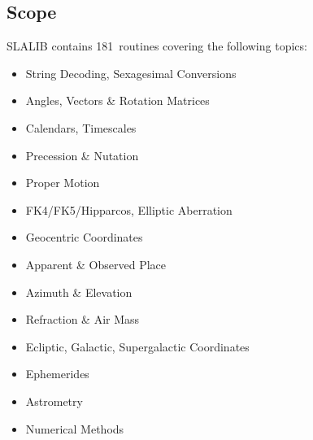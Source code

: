 \documentclass[11pt,twoside]{article}
\newcommand{\nroutines} {181}
\begin{document}
\subsection{Scope}
SLALIB contains \nroutines\ routines covering the following topics:
\begin{itemize}
\item String Decoding,
      Sexagesimal Conversions
\item Angles, Vectors \& Rotation Matrices
\item Calendars,
      Timescales
\item Precession \& Nutation
\item Proper Motion
\item FK4/FK5/Hipparcos,
      Elliptic Aberration
\item Geocentric Coordinates
\item Apparent \& Observed Place
\item Azimuth \& Elevation
\item Refraction \& Air Mass
\item Ecliptic,
      Galactic,
      Supergalactic Coordinates
\item Ephemerides
\item Astrometry
\item Numerical Methods
\end{itemize}
\end{document}
